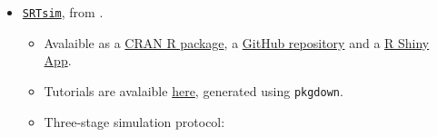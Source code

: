 \documentclass[
  letterpaper,
]{book}
\providecommand{\tightlist}{%
  \setlength{\itemsep}{0pt}\setlength{\parskip}{0pt}}\usepackage{longtable,booktabs,array}
\begin{document}
\begin{itemize}
\tightlist
\item
  \href{SRTsim:\%20spatial\%20pattern\%20preserving\%20simulations\%20for\%20spatially\%20resolved\%20transcriptomics}{\texttt{SRTsim}},
  from \textcite{zhu2023gb}.

  \begin{itemize}
  \tightlist
  \item
    Avalaible as a
    \href{https://cran.r-project.org/web/packages/SRTsim/index.html}{CRAN
    R package}, a \href{https://github.com/xzhoulab/SRTsim}{GitHub
    repository} and a \href{https://jiaqiangzhu.shinyapps.io/srtsim}{R
    Shiny App}.
  \item
    Tutorials are avalaible
    \href{https://xzhoulab.github.io/SRTsim/02_Reference_Based_Example/}{here},
    generated using \texttt{pkgdown}.
  \item
    Three-stage simulation protocol:


\end{itemize}
\end{itemize}
\end{document}
